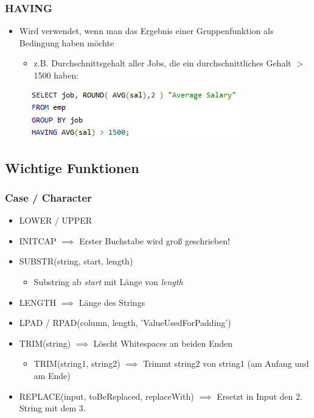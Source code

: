 \subsubsection{HAVING}
\begin{itemize}
    \item Wird verwendet, wenn man das Ergebnis einer Gruppenfunktion als Bedingung haben möchte
    \begin{itemize}
        \item z.B. Durchschnittsgehalt aller Jobs, die ein durchschnittliches Gehalt $>$ 1500 haben:
    \end{itemize}
\end{itemize}
\begin{figure}[ht!]
    \centering 
    \includegraphics[]{res/themenkorb_2/having.png}
\end{figure}

\subsection{Wichtige Funktionen}

\subsubsection{Case / Character}
\begin{itemize}
    \item LOWER / UPPER
    \item INITCAP $\implies$ Erster Buchstabe wird groß geschrieben!
    \item SUBSTR(string, start, length)
    \begin{itemize}
        \item Substring ab \textit{start} mit Länge von \textit{length}
    \end{itemize}
    \item LENGTH $\implies$ Länge des Strings
    \item LPAD / RPAD(column, length, 'ValueUsedForPadding')
    \item TRIM(string) $\implies$ Löscht Whitespaces an beiden Enden
    \begin{itemize}
        \item TRIM(string1, string2) $\implies$ Trimmt string2 von string1 (am Anfang und am Ende)
    \end{itemize}
    \item REPLACE(input, toBeReplaced, replaceWith) $\implies$ Ersetzt in Input den 2. String mit dem 3.
\end{itemize}

